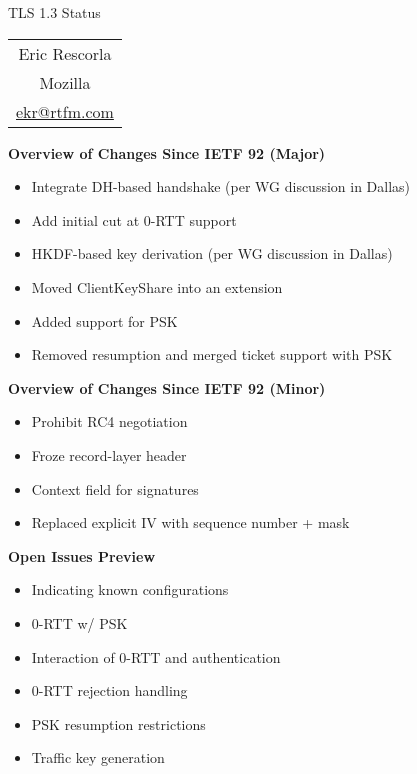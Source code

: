 \documentclass[helvetica]{seminar}
\newcommand{\heading}[1]{%
  \begin{center} 
    \large\bf 
    #1 
  \end{center} 
  \vspace{.4 in}}
\begin{document}
\begin{slide}
\begin{center}
\vspace{.5 in}
\LARGE{{\bf}TLS 1.3 Status}\\
\vspace{.2in}
\large{
\begin{tabular}{c}
Eric Rescorla\\
Mozilla\\
\url{ekr@rtfm.com}
\end{tabular}
}
\end{center}

\end{slide}

\centerslidesfalse 

\begin{slide}
\heading{Overview of Changes Since IETF 92 (Major)}

\begin{itemize}
\item Integrate DH-based handshake (per WG discussion in Dallas)
\item Add initial cut at 0-RTT support
\item HKDF-based key derivation (per WG discussion in Dallas)
\item Moved ClientKeyShare into an extension
\item Added support for PSK
\item Removed resumption and merged ticket support with PSK
\end{itemize}
\end{slide}

\begin{slide}
\heading{Overview of Changes Since IETF 92 (Minor)}

\begin{itemize}
\item Prohibit RC4 negotiation
\item Froze record-layer header
\item Context field for signatures
\item Replaced explicit IV with sequence number + mask
\end{itemize}
\end{slide}



\begin{slide}
\heading{Open Issues Preview}

\begin{itemize}
\item Indicating known configurations
\item 0-RTT w/ PSK
\item Interaction of 0-RTT and authentication
\item 0-RTT rejection handling
\item PSK resumption restrictions
\item Traffic key generation
\end{itemize}

\end{slide}
\end{document}
